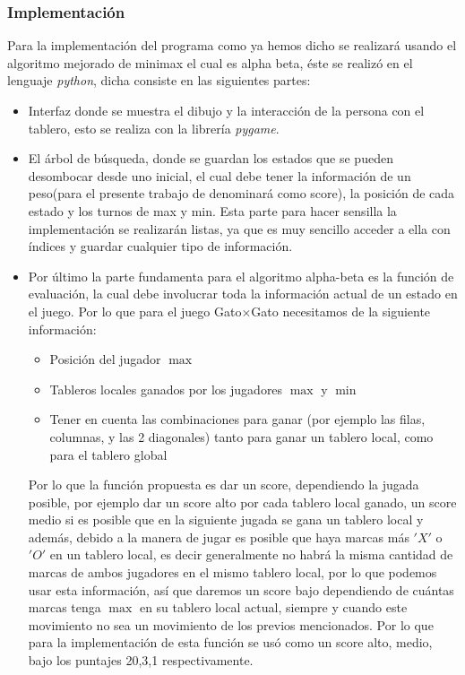 \documentclass[runningheads]{llncs}
\begin{document}
\subsubsection{Implementación}
Para la implementación del programa como ya hemos dicho se realizará usando el algoritmo mejorado de minimax el cual es alpha beta, éste se realizó en el lenguaje \textit{python}, dicha consiste en las siguientes partes: 
\begin{itemize}
\item Interfaz donde se muestra el dibujo y la interacción de la persona con el tablero, esto se realiza con la librería \textit{pygame}.
\item El árbol de búsqueda, donde se guardan los estados que se pueden desombocar desde uno inicial, el cual debe tener la información de un peso(para el presente trabajo de denominará como score), la posición de cada estado y los turnos de max y min. Esta parte para hacer sensilla la implementación se realizarán listas, ya que es muy sencillo acceder a ella con índices y guardar cualquier tipo de información.
\item Por último la parte fundamenta para el algoritmo alpha-beta es la función de evaluación, la cual debe involucrar toda la información actual de un estado en el juego. Por lo que para el juego Gato$\times$Gato necesitamos de la siguiente información:
\begin{itemize}
    \item Posición del jugador $\max$
    \item Tableros locales ganados por los jugadores $\max$ y $\min$
    \item Tener en cuenta las combinaciones para ganar (por ejemplo las filas, columnas, y las 2 diagonales) tanto para ganar un tablero local, como para el tablero global
\end{itemize}
Por lo que la función propuesta es dar un score, dependiendo la jugada posible, por ejemplo dar un score alto por cada tablero local ganado, un score medio si es posible que en la siguiente jugada se gana un tablero local y además, debido a la manera de jugar es posible que haya marcas más $'X'$ o $'O'$ en un tablero local, es decir generalmente no habrá la misma cantidad de marcas de ambos jugadores en el mismo tablero local, por lo que podemos usar esta información, así que daremos un score bajo dependiendo de cuántas marcas tenga $\max$ en su tablero local actual, siempre y cuando este movimiento no sea un movimiento de los previos mencionados. Por lo que para la implementación de esta función se usó como un score alto, medio, bajo los puntajes 20,3,1 respectivamente. 
\end{itemize}
\end{document}
